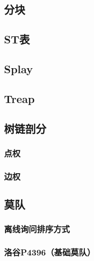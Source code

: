 \documentclass[12pt,a4paper]{article}
\begin{document}
\subsection{分块}

\subsection{ST表}

\subsection{Splay}

\subsection{Treap}

\subsection{树链剖分}
\subsubsection{点权}
\begin{spacing}{1.5}

\end{spacing}

\subsubsection{边权}
\begin{spacing}{1.5}

\end{spacing}

\subsection{莫队}
\subsubsection{离线询问排序方式}
\begin{spacing}{1.5}

\end{spacing}
\subsubsection{洛谷P4396（基础莫队）}
\begin{spacing}{1.5}

\end{spacing}

\end{document}
